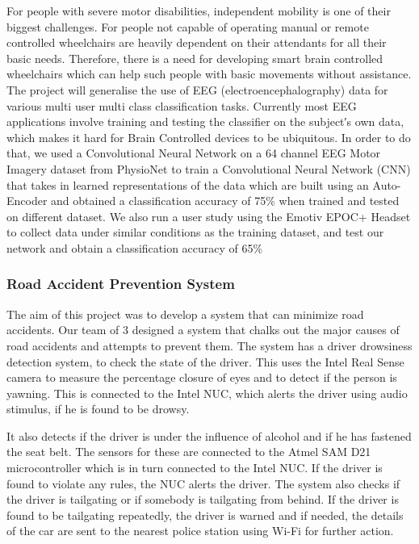 \documentclass{article}
\begin{document}
For people with severe motor disabilities, independent mobility is one of their biggest challenges. For people not capable of operating manual or remote controlled wheelchairs are heavily dependent on their attendants for all their basic needs. Therefore, there is a need for developing smart brain controlled wheelchairs which can help such people with basic movements without assistance. The project will generalise the use of EEG (electroencephalography) data for various multi user multi class classification tasks. Currently most EEG applications involve training and testing the classifier on the subject′s own data, which makes it hard for Brain Controlled devices to be ubiquitous. In order to do that, we used a Convolutional Neural Network on a 64 channel EEG Motor Imagery dataset from PhysioNet to train a Convolutional Neural Network (CNN) that takes in learned representations of the data which are built using an Auto-Encoder and obtained a classification accuracy of 75\% when trained and tested on different dataset. We also run a user study using the Emotiv EPOC+ Headset to collect data under similar conditions as the training dataset, and test our network and obtain a classification accuracy of 65\%

\subsubsection{Road Accident Prevention System}

The aim of this project was to develop a system that can minimize road accidents. Our team of 3 designed a system that chalks out the major causes of road accidents and attempts to prevent them. The system has a driver drowsiness detection system, to check the state of the driver. This uses the Intel Real Sense camera to measure the percentage closure of eyes and to detect if the person is yawning. This is connected to the Intel NUC, which alerts the driver using audio stimulus, if he is found to be drowsy.

It also detects if the driver is under the influence of alcohol and if he has fastened the seat belt. The sensors for these are connected to the Atmel SAM D21 microcontroller which is in turn connected to the Intel NUC. If the driver is found to violate any rules, the NUC alerts the driver. The system also checks if the driver is tailgating or if somebody is tailgating from behind. If the driver is found to be tailgating repeatedly, the driver is warned and if needed, the details of the car are sent to the nearest police station using Wi-Fi for further action.
\end{document}

